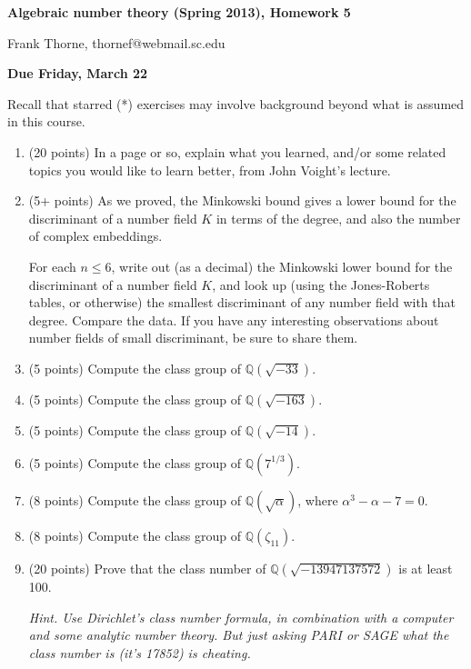 \documentclass[12pt]{article}
\newcommand{\Q}{\mathbb{Q}}
\begin{document}
\setlength{\topmargin}{-2mm}





\begin{center}{\bf Algebraic number theory (Spring 2013), Homework 5}
\end{center}
\begin{center}Frank Thorne, thornef@webmail.sc.edu
\end{center}
\begin{center}
{\bf Due Friday, March 22}
\end{center}
Recall that starred (*) exercises may involve background beyond what is assumed in this course.

\begin{enumerate}
\item (20 points)
In a page or so, 
explain what you learned, and/or some related topics you would like to learn better, from John Voight's lecture.

\item (5+ points)
As we proved, the Minkowski bound gives a lower bound for the discriminant of a number field $K$ in terms
of the degree, and also the number of complex embeddings.

For each $n \leq 6$, write out (as a decimal) the Minkowski lower bound for the discriminant of a number field
$K$, and look up (using the Jones-Roberts tables, or otherwise) the smallest discriminant of any number field with that
degree. Compare the data. If you have any interesting observations about number fields of small discriminant,
be sure to share them.

\item (5 points)
Compute the class group of $\Q(\sqrt{-33})$.

\item (5 points)
Compute the class group of $\Q(\sqrt{-163})$.

\item (5 points)
Compute the class group of $\Q(\sqrt{-14})$.

\item (5 points)
Compute the class group of $\Q(7^{1/3})$.

\item (8 points)
Compute the class group of $\Q(\sqrt{\alpha})$, where $\alpha^3 - \alpha - 7 = 0$.

\item (8 points)
Compute the class group of $\Q(\zeta_{11})$.

\item (20 points)
Prove that the class number of $\Q(\sqrt{-13947137572})$ is at least 100.

{\itshape Hint.
Use Dirichlet's class number formula, in combination with a computer and some analytic number theory. 
But just asking PARI or SAGE what the class number is (it's 17852) is cheating.}

\end{enumerate}
\end{document}
